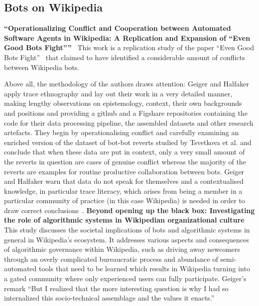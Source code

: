 \documentclass[pdftex,a4paper,11pt]{scrartcl}
\begin{document}
\subsection{Bots on Wikipedia}
\textbf{``Operationalizing Conflict and Cooperation between Automated Software Agents in Wikipedia: A Replication and Expansion of “Even Good Bots Fight”''}~\cite{GeiHal2017}
\newline
\newline
This work is a replication study of the paper ``Even Good Bots Fight''~\cite{TsvetkovaEtAl2017} that claimed to have identified a considerable amount of conflicts between Wikipedia bots.

Above all, the methodology of the authors draws attention: Geiger and Halfaker apply trace ethnography and lay out their work in a very detailed manner, making lengthy observations on epistemology, context, their own backgrounds and positions and providing a github and a Figshare repositories containing the code for their data processing pipeline, the assembled datasets and other research artefacts.
They begin by operationalising conflict and carefully examining an enriched version of the dataset of bot-bot reverts studied by Tsvetkova et al. and conclude that when these data are put in context, only a very small amount of the reverts in question are cases of genuine conflict whereas the majority of the reverts are examples for routine productive collaboration between bots.
Geiger and Halfaker warn that data do not speak for themselves and a contextualised knowledge, in particular trace literacy, which arises from being a member in a particular community of practice (in this case Wikipedia) is needed in order to draw correct conclusions~\cite{GeiHal2017}.
\newline
\newline
\textbf{Beyond opening up the black box: Investigating the role of algorithmic systems in Wikipedian organizational culture}~\cite{Geiger2017}
\newline
\newline
This study discusses the societal implications of bots and algorithmic systems in general in Wikipedia's ecosystem.
It addresses various aspects and consequences of algorithmic governance within Wikipedia, such as driving away newcomers through an overly complicated bureaucratic process and abundance of semi-automated tools that need to be learned which results in Wikipedia turning into a gated community where only experienced users can fully participate.
Geiger's remark
``But I realized that the more interesting question is why I had so internalized this socio-technical assemblage and the values it enacts.''
\end{document}
